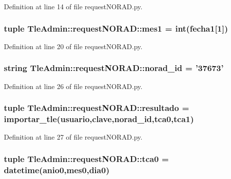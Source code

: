 \-Definition at line 14 of file request\-N\-O\-R\-A\-D.\-py.

\subsubsection[{mes1}]{\setlength{\rightskip}{0pt plus 5cm}tuple {\bf \-Tle\-Admin\-::request\-N\-O\-R\-A\-D\-::mes1} = int({\bf fecha1}[1])}\label{namespace_tle_admin_1_1request_n_o_r_a_d_a017e5869892b9bc0b3388d87997c281b}


\-Definition at line 20 of file request\-N\-O\-R\-A\-D.\-py.

\subsubsection[{norad\-\_\-id}]{\setlength{\rightskip}{0pt plus 5cm}string {\bf \-Tle\-Admin\-::request\-N\-O\-R\-A\-D\-::norad\-\_\-id} = '37673'}\label{namespace_tle_admin_1_1request_n_o_r_a_d_a23f2f8d8dfb22540a9c1368000697dac}


\-Definition at line 26 of file request\-N\-O\-R\-A\-D.\-py.

\subsubsection[{resultado}]{\setlength{\rightskip}{0pt plus 5cm}tuple {\bf \-Tle\-Admin\-::request\-N\-O\-R\-A\-D\-::resultado} = importar\-\_\-tle({\bf usuario},{\bf clave},{\bf norad\-\_\-id},{\bf tca0},{\bf tca1})}\label{namespace_tle_admin_1_1request_n_o_r_a_d_af5f55602db24a76953b38e79379ea25a}


\-Definition at line 27 of file request\-N\-O\-R\-A\-D.\-py.

\subsubsection[{tca0}]{\setlength{\rightskip}{0pt plus 5cm}tuple {\bf \-Tle\-Admin\-::request\-N\-O\-R\-A\-D\-::tca0} = datetime({\bf anio0},{\bf mes0},{\bf dia0})}\label{namespace_tle_admin_1_1request_n_o_r_a_d_a56f7b53dfda9de64dcfea8d83c48d5bd}


